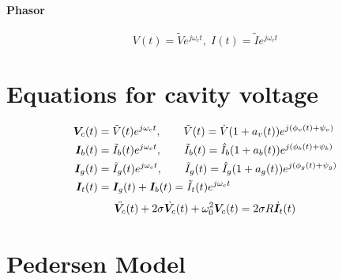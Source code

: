 \documentclass[book]{jlreq}
\begin{document}
\paragraph{Phasor}
\begin{equation}
    V(t) = \tilde{V}e^{j\omega_c t}, \; I(t) = \tilde{I}e^{j\omega_c t}
\end{equation}

\clearpage

\section{Equations for cavity voltage}
\begin{equation}
    \begin{split}
        \vb*{V}_c(t) &= \tilde{V}(t)e^{j\omega_c t},\qquad \tilde{V}(t) = \hat{V}(1+a_v(t))e^{j(\phi_v(t)+\psi_v)} \\
        \vb*{I}_b(t) &= \tilde{I}_b(t) e^{j\omega_c t},\qquad \tilde{I}_b(t) = \hat{I}_b(1+a_b(t))e^{j(\phi_b(t)+\psi_b)} \\
        \vb*{I}_g(t) &= \tilde{I}_g(t) e^{j\omega_c t},\qquad \tilde{I}_g(t) = \hat{I}_g(1+a_g(t))e^{j(\phi_g(t)+\psi_g)} \\
        \vb*{I}_t(t) &= \vb*{I}_g(t) + \vb*{I}_b(t) = \tilde{I}_t(t) e^{j\omega_c t}
    \end{split}
\end{equation}
%
%
\begin{equation}
    \ddot{\vb*{V}_c}(t) + 2 \sigma \dot{\vb*{V}_c}(t) + \omega_0^2 \vb*{V}_c(t) = 2\sigma R \dot{\vb*{I}}_t(t)
\end{equation}
%
\clearpage

\section{Pedersen Model}
\end{document}
